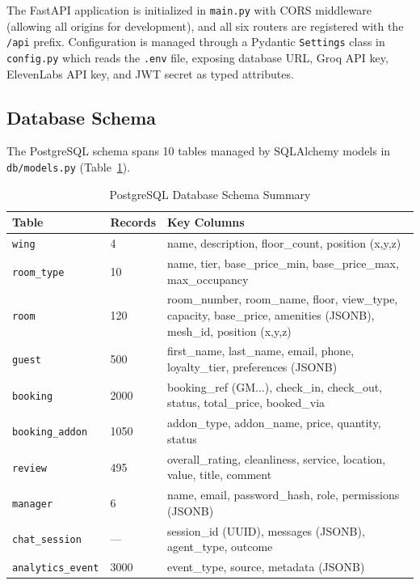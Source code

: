 \documentclass[11pt,a4paper]{report}
\begin{document}
The FastAPI application is initialized in \texttt{main.py} with CORS middleware (allowing all origins for development), and all six routers are registered with the \texttt{/api} prefix. Configuration is managed through a Pydantic \texttt{Settings} class in \texttt{config.py} which reads the \texttt{.env} file, exposing database URL, Groq API key, ElevenLabs API key, and JWT secret as typed attributes.

\subsection{Database Schema}

The PostgreSQL schema spans 10 tables managed by SQLAlchemy models in \texttt{db/models.py} (Table~\ref{tab:schema}).

\begin{table}[H]
\centering
\caption{PostgreSQL Database Schema Summary}
\label{tab:schema}
\renewcommand{\arraystretch}{1.3}
\begin{tabular}{p{3.5cm} p{3cm} p{6.5cm}}
\toprule
\textbf{Table} & \textbf{Records} & \textbf{Key Columns} \\
\midrule
\rowcolor{rowgray}
\texttt{wing} & 4 & name, description, floor\_count, position (x,y,z) \\
\texttt{room\_type} & 10 & name, tier, base\_price\_min, base\_price\_max, max\_occupancy \\
\rowcolor{rowgray}
\texttt{room} & 120 & room\_number, room\_name, floor, view\_type, capacity, base\_price, amenities (JSONB), mesh\_id, position (x,y,z) \\
\texttt{guest} & 500 & first\_name, last\_name, email, phone, loyalty\_tier, preferences (JSONB) \\
\rowcolor{rowgray}
\texttt{booking} & 2000 & booking\_ref (GM...), check\_in, check\_out, status, total\_price, booked\_via \\
\texttt{booking\_addon} & 1050 & addon\_type, addon\_name, price, quantity, status \\
\rowcolor{rowgray}
\texttt{review} & 495 & overall\_rating, cleanliness, service, location, value, title, comment \\
\texttt{manager} & 6 & name, email, password\_hash, role, permissions (JSONB) \\
\rowcolor{rowgray}
\texttt{chat\_session} & — & session\_id (UUID), messages (JSONB), agent\_type, outcome \\
\texttt{analytics\_event} & 3000 & event\_type, source, metadata (JSONB) \\
\bottomrule
\end{tabular}
\end{table}
\end{document}
